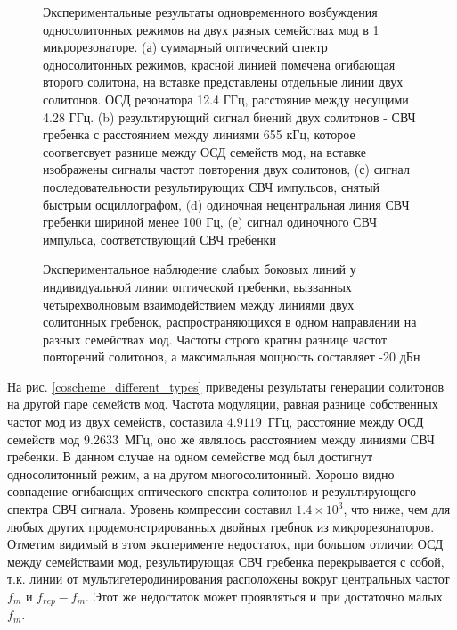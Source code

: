 \begin{figure}[ht]
\begin{minipage}[ht]{1\linewidth}
\end{minipage}
\caption{Экспериментальные результаты одновременного возбуждения односолитонных режимов на двух разных семействах мод в 1 микрорезонаторе. (а) суммарный оптический спектр односолитонных режимов, красной линией помечена огибающая второго солитона, на вставке представлены отдельные линии двух солитонов. ОСД резонатора 12.4 ГГц, расстояние между несущими 4.28 ГГц. (b) результирующий сигнал биений двух солитонов - СВЧ гребенка с расстоянием между линиями 655 кГц, которое соответсвует разнице между ОСД семейств мод, на вставке изображены сигналы частот повторения двух солитонов, (с) сигнал последовательности результирующих СВЧ импульсов, снятый быстрым осциллографом, (d) одиночная нецентральная линия СВЧ гребенки шириной менее 100 Гц, (е) сигнал одиночного СВЧ импульса, соответствующий СВЧ гребенки}
\label{Co_Scheme_results}
\end{figure}

\begin{figure}[ht]
\begin{minipage}[ht]{1\linewidth}
\end{minipage}
\caption{Экспериментальное наблюдение слабых боковых линий у индивидуальной линии оптической гребенки, вызванных четырехволновым взаимодействием между линиями двух солитонных гребенок, распространяющихся в одном направлении на разных семействах мод. Частоты строго кратны разнице частот повторений солитонов, а максимальная мощность составляет -20 дБн}
\label{fig4_intermodulation}
\end{figure}

На рис. \ref{coscheme_different_types} приведены результаты генерации солитонов на другой паре семейств мод. Частота модуляции, равная разнице собственных частот мод из двух семейств, составила $4.9119$~ГГц, расстояние между ОСД семейств мод 9.2633~МГц, оно же являлось расстоянием между линиями СВЧ гребенки. В данном случае на одном семействе мод был достигнут односолитонный режим, а на другом многосолитонный. Хорошо видно совпадение огибающих оптического спектра солитонов и результирующего спектра СВЧ сигнала. Уровень компрессии составил $1.4\times10^3$, что ниже, чем для любых других продемонстрированных двойных гребнок из микрорезонаторов. Отметим видимый в этом эксперименте недостаток, при большом отличии ОСД между семействами мод, результирующая СВЧ гребенка перекрывается с собой, т.к. линии от мультигетеродинирования расположены вокруг центральных частот $f_m$ и $f_{rep}-f_m$. Этот же недостаток может проявляться и при достаточно малых $f_m$.

